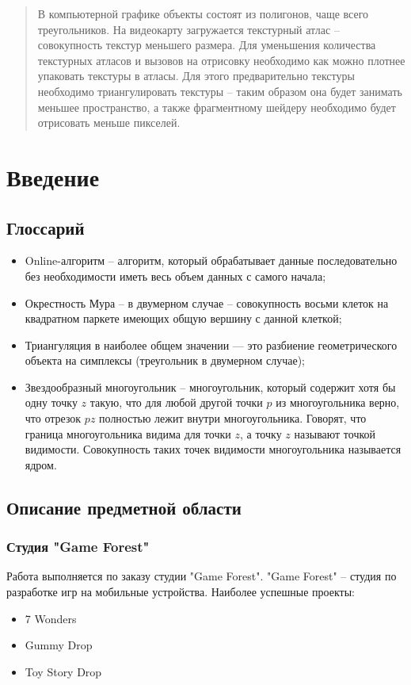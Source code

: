 \documentclass{fefu}
\author{Терехов Д.Е.}
\begin{document}
\makereporttitle
\tableofcontents
\pagebreak
\begin{abstract}
    В компьютерной графике объекты состоят из полигонов, чаще всего треугольников.
    На видеокарту загружается текстурный атлас -- совокупность текстур меньшего размера.
    Для уменьшения количества текстурных атласов и вызовов на отрисовку необходимо как можно плотнее упаковать
    текстуры в атласы. Для этого предварительно текстуры необходимо триангулировать текстуры -- таким образом
     она будет занимать меньшее пространство, а также фрагментному шейдеру необходимо будет отрисовать меньше пикселей.
\end{abstract}

\newpage
 \section{Введение}
\subsection{Глоссарий}
\begin{itemize}
    \item Online-алгоритм -- алгоритм, который обрабатывает данные последовательно без необходимости иметь весь объем
    данных с самого начала;
    \item Окрестность Мура -- в двумерном случае -- совокупность восьми клеток на квадратном паркете
    имеющих общую вершину с данной клеткой;
    \item Триангуляция в наиболее общем значении — это разбиение геометрического объекта на симплексы (треугольник в
    двумерном случае);
    \item Звездообразный многоугольник -- многоугольник, который содержит хотя бы одну точку $z$ такую, что для любой
    другой точки $p$ из многоугольника верно, что отрезок $pz$ полностью лежит внутри многоугольника. Говорят, что
    граница многоугольника видима для точки $z$, а точку $z$ называют точкой видимости. Совокупность
    таких точек видимости многоугольника называется ядром.
\end{itemize}
\subsection{Описание предметной области}
\subsubsection{Студия "Game Forest"}
Работа выполняется по заказу студии "Game Forest". "Game Forest" -- студия по разработке игр на мобильные устройства.
Наиболее успешные проекты:
\begin{itemize}
    \item 7 Wonders
    \item Gummy Drop
    \item Toy Story Drop
\end{itemize}
\end{document}
